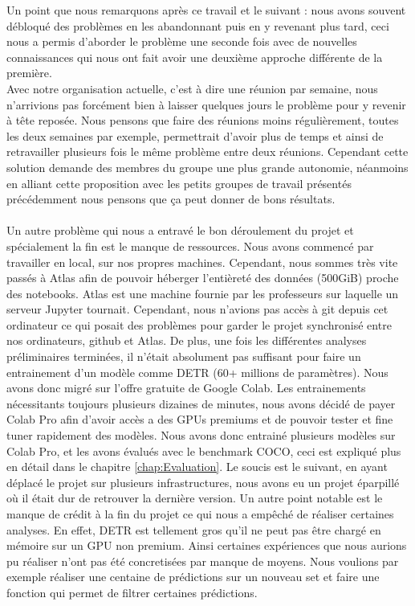 Un point que nous remarquons après ce travail et le suivant : nous avons souvent débloqué des problèmes en les abandonnant puis en y revenant plus tard, ceci nous a permis d'aborder le problème une seconde fois avec de nouvelles connaissances qui nous ont fait avoir une deuxième approche différente de la première.
\\
Avec notre organisation actuelle, c'est à dire une réunion par semaine, nous n'arrivions pas forcément bien à laisser quelques jours le problème pour y revenir à tête reposée. Nous pensons que faire des réunions moins régulièrement, toutes les deux semaines par exemple, permettrait d'avoir plus de temps et ainsi de retravailler plusieurs fois le même problème entre deux réunions. Cependant cette solution demande des membres du groupe une plus grande autonomie, néanmoins en alliant cette proposition avec les petits groupes de travail présentés précédemment nous pensons que ça peut donner de bons résultats.

\paragraph{}
Un autre problème qui nous a entravé le bon déroulement du projet et spécialement la fin est le manque de ressources. Nous avons commencé par travailler en local, sur nos propres machines. Cependant, nous sommes très vite passés à Atlas afin de pouvoir héberger l'entièreté des données (500GiB) proche des notebooks. Atlas est une machine fournie par les professeurs sur laquelle un serveur Jupyter tournait. Cependant, nous n'avions pas accès à git depuis cet ordinateur ce qui posait des problèmes pour garder le projet synchronisé entre nos ordinateurs, github et Atlas. De plus, une fois les différentes analyses préliminaires terminées, il n'était absolument pas suffisant pour faire un entrainement d'un modèle comme DETR (60+ millions de paramètres). Nous avons donc migré sur l'offre gratuite de Google Colab. Les entrainements nécessitants toujours plusieurs dizaines de minutes, nous avons décidé de payer Colab Pro afin d'avoir accès a des GPUs premiums 
et de pouvoir tester et fine tuner rapidement des modèles. Nous avons donc entrainé plusieurs modèles sur Colab Pro, et les avons évalués avec le benchmark COCO, ceci est expliqué plus en détail dans le chapitre \ref{chap:Evaluation}. Le soucis est le suivant, en ayant déplacé le projet sur plusieurs infrastructures, nous avons eu un projet éparpillé où il était dur de retrouver la dernière version. Un autre point notable est le manque de crédit à la fin du projet ce qui nous a empêché de réaliser certaines analyses. En effet, DETR est tellement gros qu'il ne peut pas être chargé en mémoire sur un GPU non premium. Ainsi certaines expériences que nous aurions pu réaliser n'ont pas été concretisées par manque de moyens. Nous voulions par exemple réaliser une centaine de prédictions sur un nouveau set et faire une fonction qui permet de filtrer certaines prédictions.
